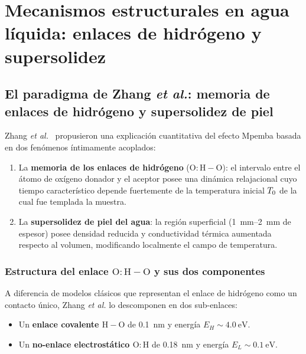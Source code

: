 \chapter{Mecanismos estructurales en agua líquida: enlaces de hidrógeno y supersolidez}
\label{ch:mecanismos_agua}

\section{El paradigma de Zhang \emph{et al.}: memoria de enlaces de hidrógeno y supersolidez de piel}

Zhang \emph{et al.}~\cite{zhang2014} propusieron una explicación cuantitativa del 
efecto Mpemba basada en dos fenómenos íntimamente acoplados:

\begin{enumerate}
\item La \textbf{memoria de los enlaces de hidrógeno} ($\mathrm{O:H{-}O}$): el 
intervalo entre el átomo de oxígeno donador y el aceptor posee una dinámica 
relajacional cuyo tiempo característico depende fuertemente de la temperatura 
inicial $T_{0}$ de la cual fue templada la muestra.
\item La \textbf{supersolidez de piel del agua}: la región superficial 
(\SIrange{1}{2}{\milli\meter} de espesor) posee densidad reducida y conductividad 
térmica aumentada respecto al volumen, modificando localmente el campo de 
temperatura.
\end{enumerate}

\subsection{Estructura del enlace $\mathrm{O:H{-}O}$ y sus dos componentes}

A diferencia de modelos clásicos que representan el enlace de hidrógeno como un 
contacto único, Zhang \emph{et al.} lo descomponen en dos sub-enlaces:

\begin{itemize}
\item Un \textbf{enlace covalente $\mathrm{H{-}O}$} de \SI{0.1}{\nano\meter} y 
energía $E_{H} \sim \SI{4.0}{\electronvolt}$.
\item Un \textbf{no-enlace electrostático $\mathrm{O{:}H}$} de 
\SI{0.18}{\nano\meter} y energía $E_{L} \sim \SI{0.1}{\electronvolt}$.
\end{itemize}

